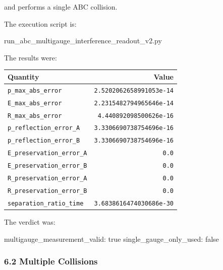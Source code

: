 \documentclass[
  a4paper,
]{article}
\newenvironment{Shaded}{}{}
\newcommand{\NormalTok}[1]{#1}
\newcounter{none} %
\begin{document}
and performs a single ABC collision.

The execution script is:

\begin{Shaded}
\begin{Highlighting}[]
\NormalTok{run\_abc\_multigauge\_interference\_readout\_v2.py}
\end{Highlighting}
\end{Shaded}

The results were:

{\def\LTcaptype{none} %
\begin{longtable}[]{@{}lr@{}}
\toprule\noalign{}
Quantity & Value \\
\midrule\noalign{}
\endhead
\bottomrule\noalign{}
\endlastfoot
\texttt{p\_max\_abs\_error} & \texttt{2.5202062658991053e-14} \\
\texttt{E\_max\_abs\_error} & \texttt{2.2315482794965646e-14} \\
\texttt{R\_max\_abs\_error} & \texttt{4.440892098500626e-16} \\
\texttt{p\_reflection\_error\_A} & \texttt{3.3306690738754696e-16} \\
\texttt{p\_reflection\_error\_B} & \texttt{3.3306690738754696e-16} \\
\texttt{E\_preservation\_error\_A} & \texttt{0.0} \\
\texttt{E\_preservation\_error\_B} & \texttt{0.0} \\
\texttt{R\_preservation\_error\_A} & \texttt{0.0} \\
\texttt{R\_preservation\_error\_B} & \texttt{0.0} \\
\texttt{separation\_ratio\_time} & \texttt{3.6838616474030686e-30} \\
\end{longtable}
}

The verdict was:

\begin{Shaded}
\begin{Highlighting}[]
\NormalTok{multigauge\_measurement\_valid: true}
\NormalTok{single\_gauge\_only\_used: false}
\end{Highlighting}
\end{Shaded}

\subsubsection{6.2 Multiple Collisions}\label{multiple-collisions}
\end{document}
